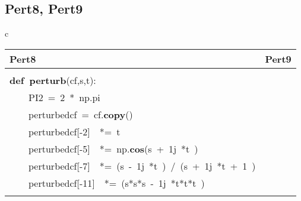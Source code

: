 \documentclass{article}\usepackage[]{graphicx}\usepackage[dvipsnames,table]{xcolor}
\makeatletter
\newcommand{\hlnum}[1]{\textcolor[rgb]{0.686,0.059,0.569}{#1}}%
\newcommand{\hlopt}[1]{\textcolor[rgb]{0,0,0}{#1}}%
\newcommand{\hldef}[1]{\textcolor[rgb]{0.345,0.345,0.345}{#1}}%
\newcommand{\hlkwa}[1]{\textcolor[rgb]{0.161,0.373,0.58}{\textbf{#1}}}%
\newcommand{\hlkwb}[1]{\textcolor[rgb]{0.69,0.353,0.396}{#1}}%
\newcommand{\hlkwd}[1]{\textcolor[rgb]{0.737,0.353,0.396}{\textbf{#1}}}%
\newenvironment{kframe}{%
 \def\at@end@of@kframe{}%
 \ifinner\ifhmode%
  \def\at@end@of@kframe{\end{minipage}}%
  \begin{minipage}{\columnwidth}%
 \fi\fi%
 \def\FrameCommand##1{\hskip\@totalleftmargin \hskip-\fboxsep
 \colorbox{shadecolor}{##1}\hskip-\fboxsep
     \hskip-\linewidth \hskip-\@totalleftmargin \hskip\columnwidth}%
 \MakeFramed {\advance\hsize-\width
   \@totalleftmargin\z@ \linewidth\hsize
   \@setminipage}}%
 {\par\unskip\endMakeFramed%
 \at@end@of@kframe}
\newenvironment{knitrout}{}{} %
\makeatother
\begin{document}
\subsection{Pert8, Pert9}
\begin{center}
\begin{tabular}{c}
\begin{tabular}{m{10cm}m{10cm}}
\toprule
Pert8 & Pert9 \\
\midrule
\begin{minipage}[m]{10cm}
\begin{knitrout}\tiny
\definecolor{shadecolor}{rgb}{0.969, 0.969, 0.969}\color{fgcolor}\begin{kframe}
\noindent
\ttfamily
\hldef{}\hlkwb{@njit}\hspace*{\fill}\\
\hldef{}\hlkwa{def\ }\hldef{}\hlkwd{perturb\textunderscore 8}\hldef{}\hlopt{(}\hldef{cf}\hlopt{,}\hldef{s}\hlopt{,}\hldef{t}\hlopt{):}\hspace*{\fill}\\
\hldef{}\hldef{\ \ \ \ }\hldef{PI2\ }\hlopt{=\ }\hldef{}\hlnum{2\ }\hldef{}\hlopt{{*}\ }\hldef{np}\hlopt{.}\hldef{pi}\hspace*{\fill}\\
\hldef{}\hldef{\ \ \ \ }\hldef{perturbed\textunderscore cf\ }\hlopt{=\ }\hldef{cf}\hlopt{.}\hldef{}\hlkwd{copy}\hldef{}\hlopt{()}\hspace*{\fill}\\
\hldef{}\hldef{\ \ \ \ }\hldef{perturbed\textunderscore cf}\hlopt{{[}{-}}\hldef{}\hlnum{2}\hldef{}\hlopt{{]}}\hldef{\ \ }\hlopt{{*}=\ }\hldef{t}\hspace*{\fill}\\
\hldef{}\hldef{\ \ \ \ }\hldef{perturbed\textunderscore cf}\hlopt{{[}{-}}\hldef{}\hlnum{5}\hldef{}\hlopt{{]}}\hldef{\ \ }\hlopt{{*}=\ }\hldef{np}\hlopt{.}\hldef{}\hlkwd{cos}\hldef{}\hlopt{(}\hldef{s\ }\hlopt{+\ }\hldef{}\hlnum{1}\hldef{j\ }\hlopt{{*}}\hldef{t\ }\hlopt{)}\hspace*{\fill}\\
\hldef{}\hldef{\ \ \ \ }\hldef{perturbed\textunderscore cf}\hlopt{{[}{-}}\hldef{}\hlnum{7}\hldef{}\hlopt{{]}}\hldef{\ \ }\hlopt{{*}=\ (}\hldef{s\ }\hlopt{{-}\ }\hldef{}\hlnum{1}\hldef{j\ }\hlopt{{*}}\hldef{t\ }\hlopt{)\ /\ (}\hldef{s\ }\hlopt{+\ }\hldef{}\hlnum{1}\hldef{j\ }\hlopt{{*}}\hldef{t\ }\hlopt{+\ }\hldef{}\hlnum{1\ }\hldef{}\hlopt{)}\hspace*{\fill}\\
\hldef{}\hldef{\ \ \ \ }\hldef{perturbed\textunderscore cf}\hlopt{{[}{-}}\hldef{}\hlnum{11}\hldef{}\hlopt{{]}}\hldef{\ \ }\hlopt{{*}=\ (}\hldef{s}\hlopt{{*}}\hldef{s}\hlopt{{*}}\hldef{s\ }\hlopt{{-}\ }\hldef{}\hlnum{1}\hldef{j\ }\hlopt{{*}}\hldef{t}\hlopt{{*}}\hldef{t}\hlopt{{*}}\hldef{t\ }\hlopt{)}\hspace*{\fill}\\

\end{kframe}
\end{knitrout}
\end{minipage}
\end{tabular}
\end{tabular}
\end{center}
\end{document}
